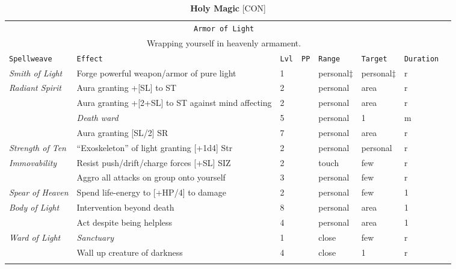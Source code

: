 \documentclass[10pt,a4paper]{article}
\begin{document}
\newpage
\begin{table}[htbp!]
\caption*{\textbf{\Large{Holy Magic}} [CON]}
\begin{tabular}{llllllll}
   \multicolumn{7}{c}{\texttt{Armor of Light}}\\
   \multicolumn{7}{c}{Wrapping yourself in heavenly armament.}\\
    \hline
    \texttt{Spellweave} & \texttt{Effect} & \texttt{Lvl} & \texttt{PP} & \texttt{Range} & \texttt{Target} & \texttt{Duration} \\
    \hline
    \multirow{1}{*}{\textit{Smith of Light}} & Forge powerful weapon/armor of pure light & 1 && personal$\ddagger$ & personal$\ddagger$ & r \\
   \hline
    \multirow{1}{*}{\textit{Radiant Spirit}} & Aura granting +[SL] to ST & 2 && personal & area & r \\
    											& Aura granting +[2+SL] to ST against mind affecting & 2 && personal & area & r \\
    											& \textit{Death ward} & 5 && personal & 1 & m \\ 
    											& Aura granting [SL/2] SR & 7 && personal & area & r \\
  
    \hline
    \multirow{1}{*}{\textit{Strength of Ten}} & ``Exoskeleton'' of light granting [+1d4] Str & 2 && personal & personal & r \\
    
    \hline
    \multirow{1}{*}{\textit{Immovability}} & Resist push/drift/charge forces [+SL] SIZ & 2 && touch & few & r \\
										  & Aggro all attacks on group onto yourself & 3 && personal & few & r\\ 
										  
	\hline
    \multirow{1}{*}{\textit{Spear of Heaven}} & Spend life-energy to [+HP/4] to damage & 2 && personal & few & 1 \\
	
	\hline
    \multirow{1}{*}{\textit{Body of Light}} & Intervention beyond death & 8 && personal & area & 1 \\
										   & Act despite being  helpless & 4 && personal & area & 1 \\
	\hline
    \multirow{1}{*}{\textit{Ward of Light}} & \textit{Sanctuary} & 1 && close & few & r\\
    										   & Wall up creature of darkness & 4 && close & 1 & r\\
    	&&&&&&\\
	

\end{tabular}
\end{table}
\end{document}
